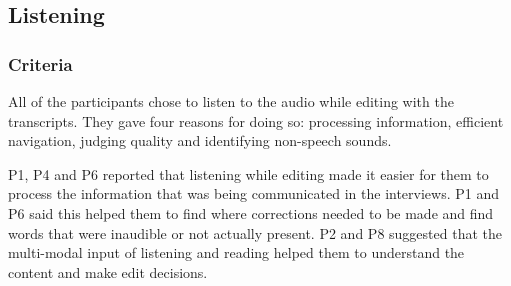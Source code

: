 



\subsection{Listening}

\subsubsection{Criteria}

All of the participants chose to listen to the audio while editing with the transcripts. They gave four reasons for
doing so: processing information, efficient navigation, judging quality and identifying non-speech sounds.

P1, P4 and P6 reported that listening while editing made it easier for them to process the information that was being
communicated in the interviews.  P1 and P6 said this helped them to find where corrections needed to be made and find
words that were inaudible or not actually present.  P2 and P8 suggested that the multi-modal input of listening and
reading helped them to understand the content and make edit decisions.

